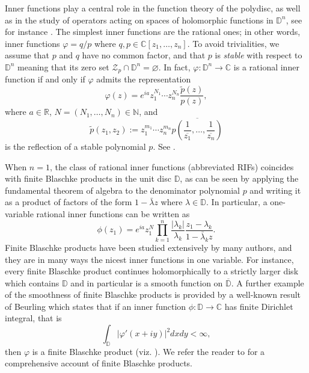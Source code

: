 \documentclass[11pt]{amsart}
\numberwithin{equation}{section}
\begin{document}
Inner functions play a central role in the function theory of the polydisc, as well as in the study of operators acting on spaces of holomorphic functions in $\mathbb{D}^n$, see for instance \cite{Rudin,AMY}. The simplest inner functions are the rational ones; in other words, inner functions $\varphi=q/p$ where $q,p \in \mathbb{C}[z_1,\ldots, z_n]$. To avoid trivialities, we assume that $p$ and $q$ have no common factor, and that $p$ is {\it stable} with respect to $\mathbb{D}^n$ meaning that its zero set $\mathcal{Z}_p\cap \mathbb{D}^n=\varnothing$. In fact, $\varphi\colon \mathbb{D}^n\to \mathbb{C}$ is a rational inner function if and only if $\varphi$ admits the representation
\[\varphi(z)=e^{ia}z_1^{N_1}\cdots z_n^{N_n}\frac{\tilde{p}(z)}{p(z)},\]
where $a\in \mathbb{R}$, $N=(N_1,\ldots, N_n)\in \mathbb{N}$, and 
\[\widetilde{p}(z_1,z_2):=z_1^{m_1}\cdots z_n^{m_n}\overline{p\left(\frac{1}{\overline{z_1}},\ldots,\frac{1}{\overline{z_n}}\right)}\]
is the reflection of a stable polynomial $p$. See \cite[Chapter 5]{Rudin}. 

When $n=1$, the class of rational inner functions (abbreviated RIFs) coincides with finite Blaschke products in the unit disc $\mathbb{D}$, as can be seen by applying the fundamental theorem of algebra to the denominator polynomial $p$ and writing it as a product of factors of the form $1-\bar{\lambda}z$ where $\lambda \in \mathbb{D}$. In particular, a one-variable rational inner functions can be written as
\[\phi(z_1)=e^{ia}z_1^N\prod_{k=1}^{n}\frac{|\lambda_k|}{\lambda_k}\frac{z_1-\lambda_k}{1-\bar{\lambda}_kz}.\]
Finite Blaschke products have been studied extensively by many authors, and they are in many ways the nicest inner functions in one variable. For instance, every finite Blaschke product continues holomorphically to a strictly larger disk which contains $\mathbb{D}$ and in particular is a smooth function on $\overline{\mathbb{D}}$. A further example of the smoothness of finite Blaschke products is provided by a well-known result of Beurling which states that if an inner function $\phi\colon \mathbb{D}\to \mathbb{C}$ has  finite Dirichlet integral, that is
\[\int_{\mathbb{D}}|\varphi'(x+iy)|^2dxdy<\infty,\] 
then $\varphi$ is a finite Blaschke product (viz.  \cite[Theorem 7.6.9]{Ransford}). We refer the reader to \cite{GMR} for a comprehensive account of finite Blaschke products.
\end{document}
